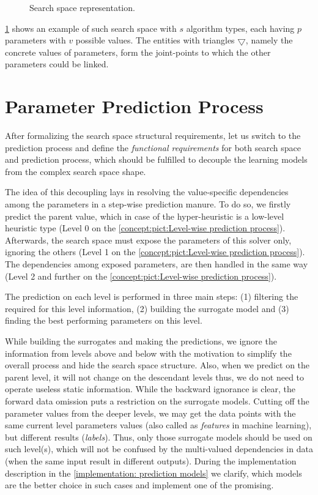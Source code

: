 \begin{figure}
	\centering
	
	\caption{Search space representation.}
	\label{concept:pict:Search Space Representation}
\end{figure}

\cref{concept:pict:Search Space Representation} shows an example of such search space with $s$ algorithm types, each having $p$ parameters with $v$ possible values. The entities with triangles $\bigtriangledown$, namely the concrete values of parameters, form the joint-points to which the other parameters could be linked. 


\section{Parameter Prediction Process}\label{concept:prediction}
After formalizing the search space structural requirements, let us switch to the prediction process and define the  \emph{functional requirements} for both search space and prediction process, which should be fulfilled to decouple the learning models from the complex search space shape.

The idea of this decoupling lays in resolving the value-specific dependencies among the parameters in a step-wise prediction manure. To do so, we firstly predict the parent value, which in case of the hyper-heuristic is a low-level heuristic type (Level 0 on the \cref{concept:pict:Level-wise prediction process}). Afterwards, the search space must expose the parameters of this solver only, ignoring the others (Level 1 on the \cref{concept:pict:Level-wise prediction process}). The dependencies among exposed parameters, are then handled in the same way (Level 2 and further on the \cref{concept:pict:Level-wise prediction process}).

The prediction on each level is performed in three main steps: (1) filtering the required for this level information, (2) building the surrogate model and (3) finding the best performing parameters on this level.

While building the surrogates and making the predictions, we ignore the information from levels above and below with the motivation to simplify the overall process and hide the search space structure. Also, when we predict on the parent level, it will not change on the descendant levels thus, we do not need to operate useless static information. While the backward ignorance is clear, the forward data omission puts a restriction on the surrogate models. Cutting off the parameter values from the deeper levels, we may get the data points with the same current level parameters values (also called as \emph{features} in machine learning), but different results (\emph{labels}). Thus, only those surrogate models should be used on such level(s), which will not be confused by the multi-valued dependencies in data (when the same input result in different outputs). During the implementation description in the \cref{implementation: prediction models} we clarify, which models are the better choice in such cases and implement one of the promising.

